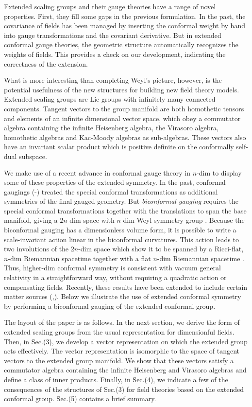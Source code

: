 \documentclass[a4paper,12pt]{article}
\begin{document}
Extended scaling groups and their gauge theories have a range of novel
properties. First, they fill some gaps in the previous formulation. In
the past, the covariance of fields has been managed by inserting the
conformal weight by hand into gauge transformations and the covariant
derivative. But in extended conformal gauge theories, the geometric
structure automatically recognizes the weights of fields. This provides a
check on our development, indicating the correctness of the extension.

What is more interesting than completing Weyl's picture, however, is the
potential usefulness of the new structures for building new field theory
models. Extended scaling groups are Lie groups with infinitely many
connected components. Tangent vectors to the group manifold are both
homothetic tensors and elements of an infinite dimensional vector space,
which obey a commutator algebra containing the infinite Heisenberg algebra,
the Virasoro algebra, homothetic algebras and Kac-Moody algebras as
sub-algebras. These vectors also have an invariant scalar product which is
positive definite on the conformally self-dual subspace.

We make use of a recent advance in conformal gauge theory in $n$-dim to
display some of these properties of the extended symmetry. In the past,
conformal gaugings (\cite{Romao+Ferber+Freund}-\cite{Townsend+van
Nieuwenhuizen}) treated the special conformal transformations as additional
symmetries of the final gauged geometry. But \textit{biconformal gauging}
requires the special conformal transformations together with the
translations to span the base manifold, giving a $2n$-dim space with $n$-dim
Weyl symmetry group \cite{New Conformal Gauging Paper}. Because the
biconformal gauging has a dimensionless volume form, it is possible to write
a scale-invariant action linear in the biconformal curvatures. This action
leads to two involutions of the $2n$-dim space which show it to be spanned
by a Ricci-flat, $n$-dim Riemannian spacetime together with a flat $n$-dim
Riemannian spacetime \cite{WWI}. Thus, higher-dim conformal symmetry is
consistent with vacuum general relativity in a straightforward way, without
requiring a quadratic action or compensating fields. Recently, these results
have been extended to include certain matter sources (\cite{WWII},\cite
{WWIII}). Below we illustrate the use of extended conformal symmetry by
performing a biconformal gauging of the extended conformal group.

\smallskip The layout of the paper is as follows. In the next section, we
derive the form of extended scaling groups from the usual representation for
dimensionful fields. Then, in Sec.(3), we develop a vector representation on
which the extended group acts effectively. The vector representation is
isomorphic to the space of tangent vectors to the extended group manifold.
We show that these vectors satisfy a commutator algebra containing the
infinite Heisenberg and Virasoro algebras and define a class of inner
products. Finally, in Sec.(4), we indicate a few of the consequences of the
structures of Sec.(3) for field theories based on the extended conformal
group. Sec.(5) contains a brief summary.
\end{document}
